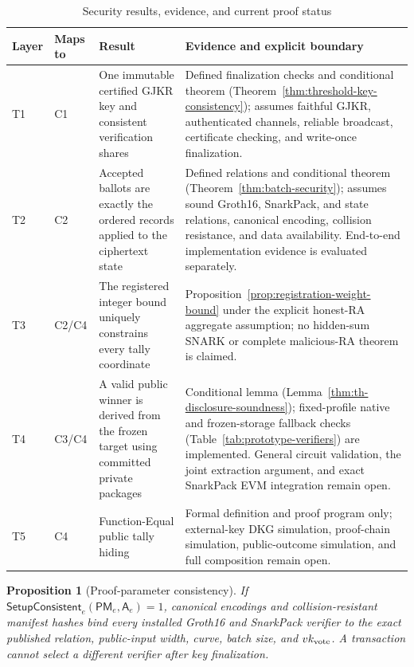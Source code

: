 \documentclass[pdflatex,sn-mathphys-num]{sn-jnl}%
\theoremstyle{thmstyleone}%
\newtheorem{proposition}[theorem]{Proposition}%
\theoremstyle{thmstyletwo}%
\theoremstyle{thmstylethree}%
\begin{document}
\begin{table}[htbp]
\centering
\caption{Security results, evidence, and current proof status}
\label{tab:security-status}
\small
\begin{tabular}{p{}p{}p{}p{}}
\toprule
Layer & Maps to & Result & Evidence and explicit boundary \\
\midrule
T1 & C1 & One immutable certified GJKR key and consistent verification shares & Defined finalization checks and conditional theorem (Theorem~\ref{thm:threshold-key-consistency}); assumes faithful GJKR, authenticated channels, reliable broadcast, certificate checking, and write-once finalization. \\
T2 & C2 & Accepted ballots are exactly the ordered records applied to the ciphertext state & Defined relations and conditional theorem (Theorem~\ref{thm:batch-security}); assumes sound Groth16, SnarkPack, and state relations, canonical encoding, collision resistance, and data availability.  End-to-end implementation evidence is evaluated separately. \\
T3 & C2/C4 & The registered integer bound uniquely constrains every tally coordinate & Proposition~\ref{prop:registration-weight-bound} under the explicit honest-RA aggregate assumption; no hidden-sum SNARK or complete malicious-RA theorem is claimed. \\
T4 & C3/C4 & A valid public winner is derived from the frozen target using committed private packages & Conditional lemma (Lemma~\ref{thm:th-disclosure-soundness}); fixed-profile native and frozen-storage fallback checks (Table~\ref{tab:prototype-verifiers}) are implemented. General circuit validation, the joint extraction argument, and exact SnarkPack EVM integration remain open. \\
T5 & C4 & Function-Equal public tally hiding & Formal definition and proof program only; external-key DKG simulation, proof-chain simulation, public-outcome simulation, and full composition remain open. \\
\bottomrule
\end{tabular}
\end{table}

\begin{proposition}[Proof-parameter consistency]
\label{prop:proof-key-consistency}
If $\mathsf{SetupConsistent}_e(\mathsf{PM}_e,\mathsf A_e)=1$, canonical
encodings and collision-resistant manifest hashes bind every installed
Groth16 and SnarkPack verifier to the exact published relation, public-input
width, curve, batch size, and $vk_{\rm vote}$.  A transaction cannot select a
different verifier after key finalization.
\end{proposition}
\end{document}
